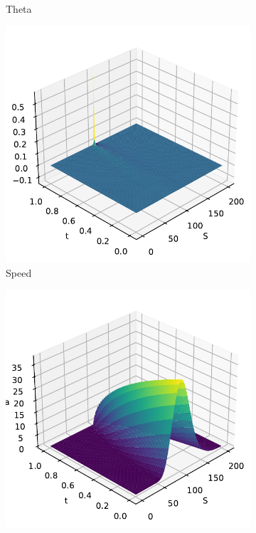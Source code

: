 \begin{figure}[H]
\begin{subfigure}[b]{0.3\linewidth}
        \caption{Theta}
    \end{subfigure}
    \begin{subfigure}[b]{0.3\linewidth}
        \includegraphics[width=\linewidth]{Imagenes/Parte1/6_Sols/Call/Call_Speed.pdf}
        \caption{Speed}
    \end{subfigure}
    \begin{subfigure}[b]{0.3\linewidth}
        \includegraphics[width=\linewidth]{Imagenes/Parte1/6_Sols/Call/Call_Vega.pdf}

\end{subfigure}
\end{figure}
